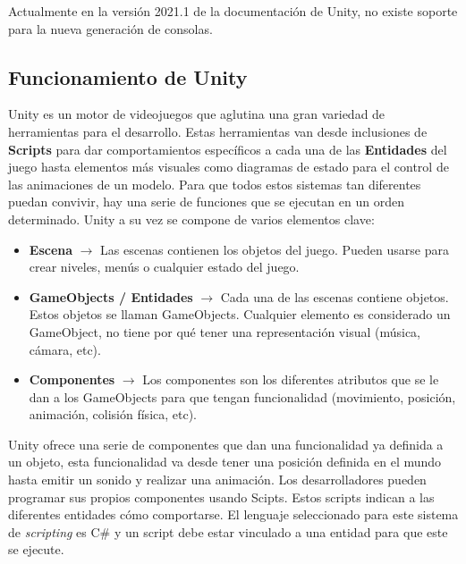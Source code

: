Actualmente en la versi\'on 2021.1 de la documentaci\'on de Unity, no existe soporte para la nueva generaci\'on de consolas.\\


\subsection {Funcionamiento de Unity}

Unity es un motor de videojuegos que aglutina una gran variedad de herramientas para el desarrollo. Estas herramientas van desde inclusiones de \textbf{Scripts} para dar comportamientos espec\'ificos a cada una de las \textbf{Entidades} del juego hasta elementos m\'as visuales como diagramas de estado para el control de las animaciones de un modelo. Para que todos estos sistemas tan diferentes puedan convivir, hay una serie de funciones que se ejecutan en un orden determinado. Unity a su vez se compone de varios elementos clave:

\begin {itemize}
\item \textbf{Escena} $\rightarrow$  Las escenas contienen los objetos del juego. Pueden usarse para crear niveles, men\'us o cualquier estado del juego.
\item \textbf{GameObjects / Entidades} $\rightarrow$ Cada una de las escenas contiene objetos. Estos objetos se llaman GameObjects. Cualquier elemento es considerado un GameObject, no tiene por qu\'e tener una representaci\'on visual (m\'usica, c\'amara, etc).
\item \textbf{Componentes} $\rightarrow$ Los componentes son los diferentes atributos que se le dan a los GameObjects para que tengan funcionalidad (movimiento, posici\'on, animaci\'on, colisi\'on f\'isica, etc).
\end {itemize}

Unity ofrece una serie de componentes que dan una funcionalidad ya definida a un objeto, esta funcionalidad va desde tener una posici\'on definida en el mundo hasta emitir un sonido y realizar una animaci\'on. Los desarrolladores pueden programar sus propios componentes usando Scipts. Estos scripts indican a las diferentes entidades c\'omo comportarse. El lenguaje seleccionado para este sistema de \textit{scripting} es C\# y un script debe estar vinculado a una entidad para que este se ejecute. \\

